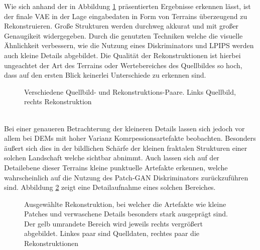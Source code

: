 Wie sich anhand der in Abbildung \ref{fig:vae_recons} präsentierten Ergebnisse erkennen lässt, ist der finale VAE in der Lage eingabedaten in Form von Terrains überzeugend zu Rekonstruieren. Große Strukturen werden durchweg akkurat und mit großer Genaugikeit widergegeben. Durch die genutzten Techniken welche die visuelle Ähnlichkeit verbessern, wie die Nutzung eines Diskriminators und LPIPS werden auch kleine Details abgebildet. Die Qualität der Rekonstruktionen ist hierbei ungeachtet der Art des Terrains oder Wertebereiches des Quellbildes so hoch, dass auf den ersten Blick keinerlei Unterschiede zu erkennen sind. 
\begin{figure}[htbp]
    \centering

    \vspace{-8pt}

    
    \caption{Verschiedene Quellbild- und Rekonstruktions-Paare. Links Quellbild, rechts Rekonstruktion}
    \label{fig:vae_recons}
\end{figure} \\
Bei einer genaueren Betrachterung der kleineren Details lassen sich jedoch vor allem bei DEMs mit hoher Varianz Komrpessionsartefakte beobachten. Besonders äußert sich dies in der bildlichen Schärfe der kleinen fraktalen Strukturen einer solchen Landschaft welche sichtbar abnimmt. Auch lassen sich auf der Detailebene dieser Terrains kleine punktuelle Artefakte erkennen, welche wahrscheinlich auf die Nutzung des Patch-GAN Diskriminators zurückzuführen sind. Abbildung \ref{fig:vae_artefacts} zeigt eine Detailaufnahme eines solchen Bereiches.
\begin{figure}[htbp]
    \centering
    \caption{Ausgewählte Rekonstruktion, bei welcher die Artefakte wie kleine Patches und verwaschene Details besonders stark ausgeprägt sind. Der gelb umrandete Bereich wird jeweils rechts vergrößert abgebildet. Linkes paar sind Quelldaten, rechtes paar die Rekonstruktionen}
    \label{fig:vae_artefacts}
\end{figure} \\
